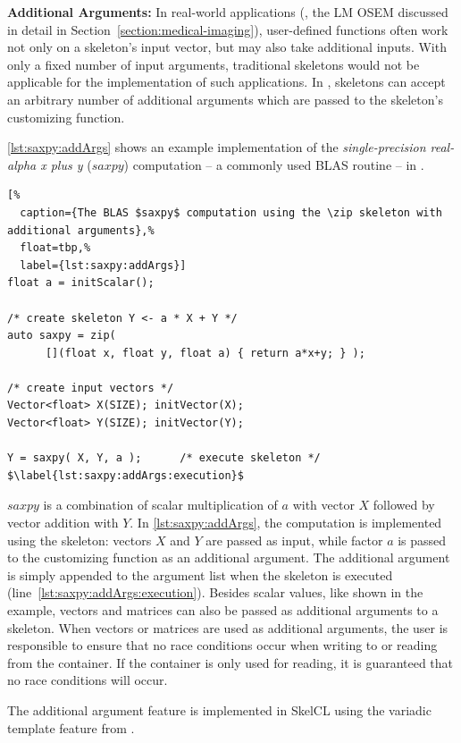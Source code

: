 \textbf{Additional Arguments:}
In real-world applications (\eg, the LM OSEM discussed in detail in Section~\ref{section:medical-imaging}), user-defined functions often work not only on a skeleton's input vector, but may also take additional inputs.
With only a fixed number of input arguments, traditional skeletons would not be applicable for the implementation of such applications.
In \SkelCL, skeletons can accept an arbitrary number of additional arguments which are passed to the skeleton's customizing function.

\autoref{lst:saxpy:addArgs} shows an example implementation of the \emph{single-precision real-alpha x plus y} ($saxpy$) computation -- a commonly used BLAS routine -- in \SkelCL.
\begin{lstlisting}[%
  caption={The BLAS $saxpy$ computation using the \zip skeleton with additional arguments},%
  float=tbp,%
  label={lst:saxpy:addArgs}]
float a = initScalar();

/* create skeleton Y <- a * X + Y */
auto saxpy = zip(
      [](float x, float y, float a) { return a*x+y; } );

/* create input vectors */
Vector<float> X(SIZE); initVector(X);
Vector<float> Y(SIZE); initVector(Y);

Y = saxpy( X, Y, a );      /* execute skeleton */ $\label{lst:saxpy:addArgs:execution}$
\end{lstlisting}
$saxpy$ is a combination of scalar multiplication of $a$ with vector $X$ followed by vector addition with $Y$.
In \autoref{lst:saxpy:addArgs}, the computation is implemented using the \zip skeleton:
vectors $X$ and $Y$ are passed as input, while factor $a$ is passed to the customizing function as an additional argument.
The additional argument is simply appended to the argument list when the skeleton is executed (line~\ref{lst:saxpy:addArgs:execution}).
Besides scalar values, like shown in the example, vectors and matrices can also be passed as additional arguments to a skeleton.
When vectors or matrices are used as additional arguments, the user is responsible to ensure that no race conditions occur when writing to or reading from the container.
If the container is only used for reading, it is guaranteed that no race conditions will occur.

The additional argument feature is implemented in SkelCL using the variadic template feature from \Cpp.

